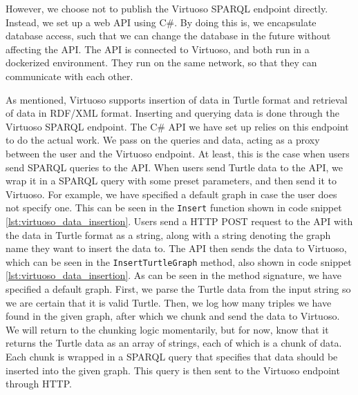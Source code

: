 However, we choose not to publish the Virtuoso SPARQL endpoint directly. Instead, we set up a web API using C\#.
By doing this is, we encapsulate database access, such that we can change the database in the future without affecting the API.
The API is connected to Virtuoso, and both run in a dockerized environment. They run on the same network, so that they can communicate with each other.

As mentioned, Virtuoso supports insertion of data in Turtle format and retrieval of data in RDF/XML format. Inserting and querying data is done through the Virtuoso SPARQL endpoint. The C\# API we have set up relies on this endpoint to do the actual work. We pass on the queries and data, acting as a proxy between the user and the Virtuoso endpoint. At least, this is the case when users send SPARQL queries to the API. When users send Turtle data to the API, we wrap it in a SPARQL query with some preset parameters, and then send it to Virtuoso. For example, we have specified a default graph in case the user does not specify one.
This can be seen in the \texttt{Insert} function shown in code snippet \ref{lst:virtuoso_data_insertion}. Users send a HTTP POST request to the API with the data in Turtle format as a string, along with a string denoting the graph name they want to insert the data to. The API then sends the data to Virtuoso, which can be seen in the \texttt{InsertTurtleGraph} method, also shown in code snippet \ref{lst:virtuoso_data_insertion}. 
As can be seen in the method signature, we have specified a default graph. First, we parse the Turtle data from the input string so we are certain that it is valid Turtle. Then, we log how many triples we have found in the given graph, after which we chunk and send the data to Virtuoso. We will return to the chunking logic momentarily, but for now, know that it returns the Turtle data as an array of strings, each of which is a chunk of data. Each chunk is wrapped in a SPARQL query that specifies that data should be inserted into the given graph. This query is then sent to the Virtuoso endpoint through HTTP.

